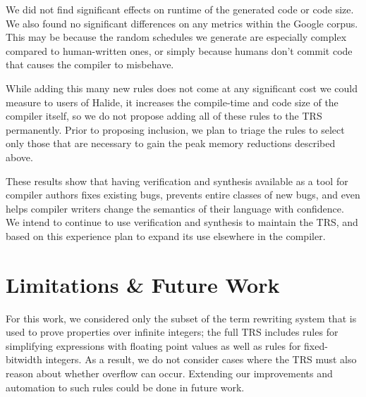 \documentclass[acmsmall]{acmart}\settopmatter{}
\newcommand{\hmax}[0]{\texttt{max}}
\newcommand{\hmin}[0]{\texttt{min}}
\newcommand{\rewrites}[0]{\:\rightarrow_{R}\:}
\begin{document}
We did not find significant effects on runtime of the generated code or code size. We also found no significant differences on any metrics within the Google corpus. This may be because the random schedules we generate are especially complex compared to human-written ones, or simply because humans don't commit code that causes the compiler to misbehave.

While adding this many new rules does not come at any significant cost we could measure to users of Halide, it increases the compile-time and code size of the compiler itself, so we do not propose adding all of these rules to the TRS permanently. Prior to proposing inclusion, we plan to triage the rules to select only those that are necessary to gain the peak memory reductions described above.

These results show that having verification and synthesis available as a tool for compiler authors fixes existing bugs, prevents entire classes of new bugs, and even helps compiler writers change the semantics of their language with confidence. We intend to continue to use verification and synthesis to maintain the TRS, and based on this experience plan to expand its use elsewhere in the compiler.






\section{Limitations \& Future Work}
\label{sec:limitations}
For this work, we considered only the subset of the term rewriting system that
is used to prove properties over infinite integers; the full TRS includes rules
for simplifying expressions with floating point values as well as rules for
fixed-bitwidth integers.  As a result, we do not consider cases where the TRS
must also reason about whether overflow can occur.  Extending our improvements
and automation to such rules could be done in future work.
\end{document}
